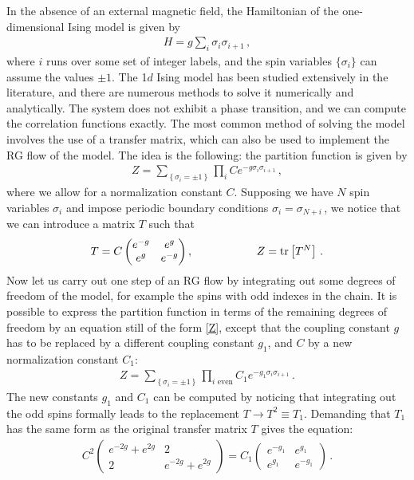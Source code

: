In the absence of an external magnetic field, the Hamiltonian of the one-dimensional Ising model is given by
\begin{gather}
  H = g \sum_i \sigma_i \sigma_{i+1}\,,
\end{gather}
where $i$ runs over some set of integer labels, and the spin variables $\{\sigma_i\}$ can assume the values $\pm 1$. The  1$d$ Ising model has been studied extensively in the literature, and there are numerous methods to solve it numerically and analytically. The system does not exhibit a phase transition, and we can compute the correlation functions exactly. The most common method of solving the model involves the use of a transfer matrix, which can also be used to implement the RG flow of the model. The idea is the following: the partition function is given by
\begin{gather}
 Z = \sum_{ \left\{ \sigma_i = \pm 1\right\}} \prod_i C e^{-g \sigma_i \sigma_{i+1}}\,,
 \label{Z}
\end{gather}
where we allow for a normalization constant $C$. Supposing we have $N$ spin variables $\sigma_i$ and impose periodic boundary conditions $\sigma_i=\sigma_{N+i}\,$, we notice that we can introduce a matrix $T$ such that
\begin{gather}
T = C\begin{pmatrix}
 e^{-g} & e^{g}\\
 e^{g} & e^{-g}
\end{pmatrix},\hspace{20mm} Z  = \operatorname{tr}\left[ T^N\right] \,. \label{eq:partfunc}
\end{gather}
Now let us carry out one step of an RG flow by integrating out some degrees of freedom of the model, for example the spins with odd indexes in the chain. It is possible to express the partition function in terms of the remaining degrees of freedom by an equation still of the form \cref{Z}, except that the coupling constant $g$ has to be replaced by a different coupling constant $g_1$, and $C$ by a new normalization constant $C_1$: 
\begin{gather}
 Z = \sum_{ \left\{ \sigma_i = \pm 1\right\}} \prod_{i \text{ even}} C_1e^{-g_1 \sigma_i \sigma_{i+1}}\,.
 \label{Z1}
\end{gather}
The new constants $g_1$ and $C_1$ can be computed by noticing that integrating out the odd spins formally leads to the replacement $T\to T^2 \equiv T_1$. Demanding that $T_1$ has the same form as the original transfer matrix $T$ gives the equation:
\begin{gather}
C^2\begin{pmatrix}
  e^{-2g}+e^{2g} & 2\\
  2 & e^{-2g}+e^{2g}
\end{pmatrix}
=
C_1\begin{pmatrix}
 e^{-g_1} & e^{g_1}\\
 e^{g_1} & e^{-g_1}
\end{pmatrix}
\,.
\end{gather}

